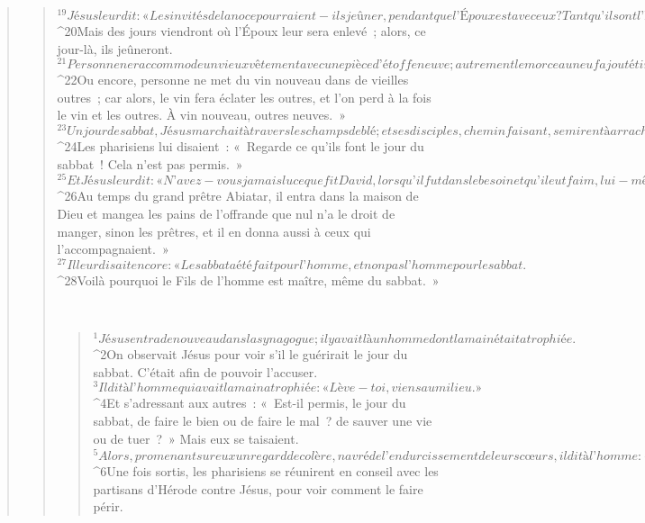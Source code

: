 \begin{verse}
\begin{verse}
${}^{19}Jésus leur dit : « Les invités de la noce pourraient-ils jeûner, pendant que l’Époux est avec eux ? Tant qu’ils ont l’Époux avec eux, ils ne peuvent pas jeûner. 
${}^{20}Mais des jours viendront où l’Époux leur sera enlevé ; alors, ce jour-là, ils jeûneront.
${}^{21}Personne ne raccommode un vieux vêtement avec une pièce d’étoffe neuve ; autrement le morceau neuf ajouté tire sur le vieux tissu et la déchirure s’agrandit. 
${}^{22}Ou encore, personne ne met du vin nouveau dans de vieilles outres ; car alors, le vin fera éclater les outres, et l’on perd à la fois le vin et les outres. À vin nouveau, outres neuves. »
${}^{23}Un jour de sabbat, Jésus marchait à travers les champs de blé ; et ses disciples, chemin faisant, se mirent à arracher des épis. 
${}^{24}Les pharisiens lui disaient : « Regarde ce qu’ils font le jour du sabbat ! Cela n’est pas permis. » 
${}^{25}Et Jésus leur dit : « N’avez-vous jamais lu ce que fit David, lorsqu’il fut dans le besoin et qu’il eut faim, lui-même et ceux qui l’accompagnaient ? 
${}^{26}Au temps du grand prêtre Abiatar, il entra dans la maison de Dieu et mangea les pains de l’offrande que nul n’a le droit de manger, sinon les prêtres, et il en donna aussi à ceux qui l’accompagnaient. »
${}^{27}Il leur disait encore : « Le sabbat a été fait pour l’homme, et non pas l’homme pour le sabbat. 
${}^{28}Voilà pourquoi le Fils de l’homme est maître, même du sabbat. »
      
         
      \bchapter{}
      \begin{verse}
${}^{1}Jésus entra de nouveau dans la synagogue ; il y avait là un homme dont la main était atrophiée. 
${}^{2}On observait Jésus pour voir s’il le guérirait le jour du sabbat. C’était afin de pouvoir l’accuser. 
${}^{3}Il dit à l’homme qui avait la main atrophiée : « Lève-toi, viens au milieu. » 
${}^{4}Et s’adressant aux autres : « Est-il permis, le jour du sabbat, de faire le bien ou de faire le mal ? de sauver une vie ou de tuer ? » Mais eux se taisaient. 
${}^{5}Alors, promenant sur eux un regard de colère, navré de l’endurcissement de leurs cœurs, il dit à l’homme : « Étends la main. » Il l’étendit, et sa main redevint normale. 
${}^{6}Une fois sortis, les pharisiens se réunirent en conseil avec les partisans d’Hérode contre Jésus, pour voir comment le faire périr.
      

\end{verse}
\end{verse}
\end{verse}
